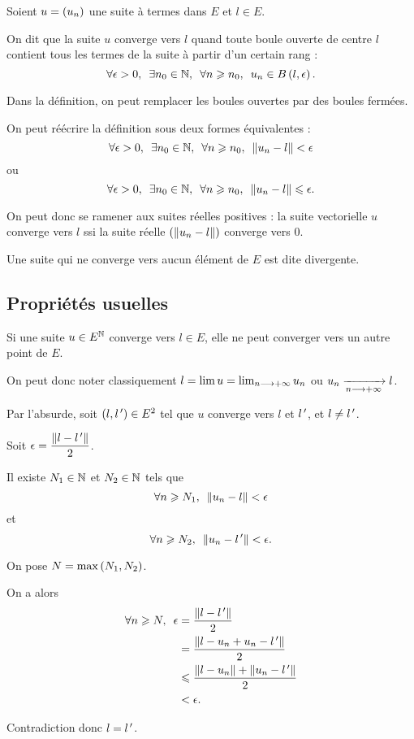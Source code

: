 \begin{defi}
Soient \(u=\left(u_n\right)\) une suite à termes dans \(E\) et \(l\in E\).

On dit que la suite \(u\) converge vers \(l\) quand toute boule ouverte de centre \(l\) contient tous les termes de la suite à partir d'un certain rang : \[\quantifs{\forall\epsilon>0;\exists n_0\in\N;\forall n\geq n_0}u_n\in\bouleo{l}{\epsilon}.\]
\end{defi}

\begin{prop}
Dans la définition, on peut remplacer les boules ouvertes par des boules fermées.

On peut réécrire la définition sous deux formes équivalentes : \[\quantifs{\forall\epsilon>0;\exists n_0\in\N;\forall n\geq n_0}\norme{u_n-l}<\epsilon\] ou \[\quantifs{\forall\epsilon>0;\exists n_0\in\N;\forall n\geq n_0}\norme{u_n-l}\leq\epsilon.\]

On peut donc se ramener aux suites réelles positives : la suite vectorielle \(u\) converge vers \(l\) ssi la suite réelle \(\paren{\norme{u_n-l}}\) converge vers \(0\).
\end{prop}

Une suite qui ne converge vers aucun élément de \(E\) est dite divergente.

\subsection{Propriétés usuelles}

\begin{prop}
Si une suite \(u\in E^{\mathbb{N}}\) converge vers \(l\in E\), elle ne peut converger vers un autre point de \(E\).

On peut donc noter classiquement \(l=\lim u=\lim_{n\longrightarrow+\infty}u_n\) ou \(u_n\xrightarrow[n\longrightarrow+\infty]{}l\).
\end{prop}

\begin{dem}
Par l'absurde, soit \(\left(l,l^{\,\prime}\right)\in E^2\) tel que \(u\) converge vers \(l\) et \(l^{\,\prime}\), et \(l\not=l^{\,\prime}\).

Soit \(\epsilon=\dfrac{\norme{l-l\prim}}{2}\).

Il existe \(N_1\in\mathbb{N}\) et \(N_2\in\mathbb{N}\) tels que \[\quantifs{\forall n\geq N_1}\norme{u_n-l}<\epsilon\] et \[\quantifs{\forall n\geq N_2}\norme{u_n-l\prim}<\epsilon.\]

On pose \(N=\max\left(N_1,N_2\right)\).

On a alors \[\begin{aligned}
\quantifs{\forall n\geq N}\epsilon&=\dfrac{\norme{l-l\prim}}{2} \\
&=\dfrac{\norme{l-u_n+u_n-l\prim}}{2} \\
&\leq\dfrac{\norme{l-u_n}+\norme{u_n-l\prim}}{2} \\
&<\epsilon.
\end{aligned}\]

Contradiction donc \(l=l^{\,\prime}\).
\end{dem}

